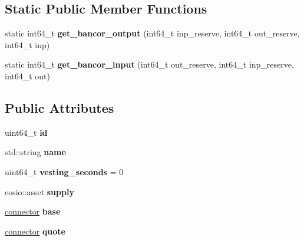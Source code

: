 \subsection*{Static Public Member Functions}
\begin{DoxyCompactItemize}
\item 
\mbox{\label{structexchange__state_a943b9f6619c754fd673abeee0712be44}} 
static int64\+\_\+t {\bfseries get\+\_\+bancor\+\_\+output} (int64\+\_\+t inp\+\_\+reserve, int64\+\_\+t out\+\_\+reserve, int64\+\_\+t inp)
\item 
\mbox{\label{structexchange__state_a32a222b082994484aadef66aef2211e8}} 
static int64\+\_\+t {\bfseries get\+\_\+bancor\+\_\+input} (int64\+\_\+t out\+\_\+reserve, int64\+\_\+t inp\+\_\+reserve, int64\+\_\+t out)
\end{DoxyCompactItemize}
\subsection*{Public Attributes}
\begin{DoxyCompactItemize}
\item 
\mbox{\label{structexchange__state_a611e5c10bf3e43db4d648d61630b78b6}} 
uint64\+\_\+t {\bfseries id}
\item 
\mbox{\label{structexchange__state_a8b788617274dac3c962c8f838037e147}} 
std\+::string {\bfseries name}
\item 
\mbox{\label{structexchange__state_ad3b052d8c1918f431e2f4a2a82042535}} 
uint64\+\_\+t {\bfseries vesting\+\_\+seconds} = 0
\item 
\mbox{\label{structexchange__state_a784cc236e2b292519abd4ced4afc6755}} 
eosio\+::asset {\bfseries supply}
\item 
\mbox{\label{structexchange__state_ac347aedb89368530adf4740be02822bd}} 
\mbox{\hyperlink{structexchange__state_1_1connector}{connector}} {\bfseries base}
\item 
\mbox{\label{structexchange__state_a72f37d7232ee04314ea2096e923c6ad5}} 
\mbox{\hyperlink{structexchange__state_1_1connector}{connector}} {\bfseries quote}
\end{DoxyCompactItemize}


